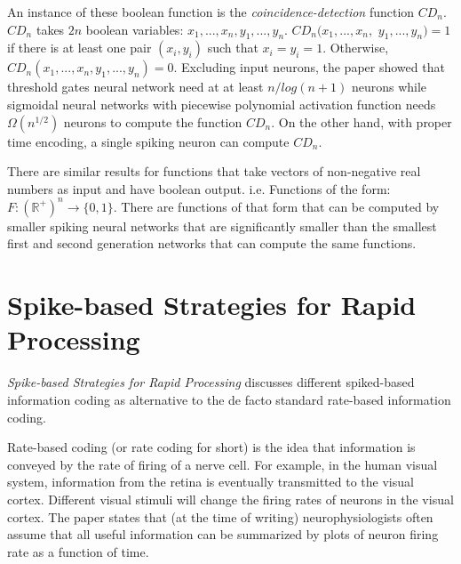 \documentclass[12pt,A4]{article}
\begin{document}
An instance of these boolean function is the \emph{coincidence-detection} function $CD_n$. 
$CD_n$ takes $2n$ boolean variables: $x_1,...,x_n,y_1,...,y_n$. $CD_n(x_1,...,x_n,$ $y_1,...,y_n) = 1$
if there is at least one pair $(x_i,y_i)$ such that $x_i = y_i = 1$. Otherwise, $CD_n(x_1,...,x_n,
y_1,...,y_n) = 0$. Excluding input neurons, the paper showed that threshold gates neural network 
need at at least $n/log(n+1)$ neurons while sigmoidal neural networks with piecewise polynomial 
activation function needs $\Omega(n^{1/2})$ neurons to compute the function $CD_n$. On the other
hand, with proper time encoding, a single spiking neuron can compute $CD_n$.

There are similar results for functions that take vectors of non-negative real numbers as input and
have boolean output. i.e. Functions of the form: $F: (\mathbb{R}^+)^n \rightarrow \{0,1\}$. There
are functions of that form that can be computed by smaller spiking neural networks that are
significantly smaller than the smallest first and second generation networks that can compute the
same functions. 


\section*{Spike-based Strategies for Rapid Processing}

\emph{Spike-based Strategies for Rapid Processing} \cite{thorpe-2001-spike} discusses different
spiked-based information coding as alternative to the de facto standard rate-based information 
coding.

Rate-based coding (or rate coding for short) is the idea that information is conveyed by the rate of
firing of a nerve cell. For example, in the human visual system, information from the retina is 
eventually transmitted to the visual cortex. Different visual stimuli will change the firing rates
of neurons in the visual cortex. The paper states that (at the time of writing) neurophysiologists 
often assume that all useful information can be summarized by plots of neuron firing rate as a 
function of time.
\end{document}

